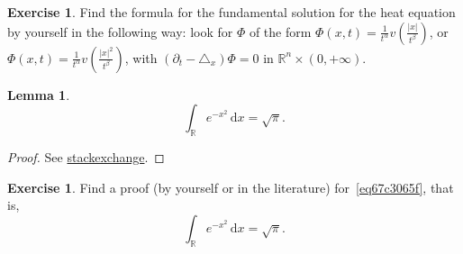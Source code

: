 \documentclass[a4paper,9pt]{amsart}
\newcommand{\R}{\mathbb{R}}	%
\newcommand{\did}{\,\mathrm{d}}	%
\newcommand{\de}{\partial}		%
\newcommand{\laplacian}{\triangle}
\theoremstyle{plain}
\newtheorem{lemma}[proposition]{Lemma}
\theoremstyle{definition}
\newtheorem{exercise}[proposition]{Exercise}%
\theoremstyle{remark}
\begin{document}
\begin{exercise}
	Find the formula for the fundamental solution for the heat equation by yourself in the following way:
	look for $\Phi$ of the form 
	$\Phi(x,t) = \frac1{t^\alpha} v\left( \frac{|x|}{t^\beta} \right)$,
	or
	$\Phi(x,t) = \frac1{t^\alpha} v\left( \frac{|x|^2}{t^\beta} \right)$,
	with $(\de_t-\laplacian_x)\Phi=0$ in $\R^n\times(0,+\infty)$.
\end{exercise}

\begin{lemma}
	\begin{equation}\label{eq67c3065f}
		\int_\R e^{-x^2}\did x = \sqrt{\pi} .
	\end{equation}
\end{lemma}
\begin{proof}
	See \href{https://math.stackexchange.com/questions/154968/is-there-really-no-way-to-integrate-e-x2}{stackexchange}.
\end{proof}

\begin{exercise}
	Find a proof (by yourself or in the literature) for~\eqref{eq67c3065f}, that is,
	\begin{equation}
		\int_\R e^{-x^2}\did x = \sqrt{\pi} .
	\end{equation}
\end{exercise}
\end{document}
